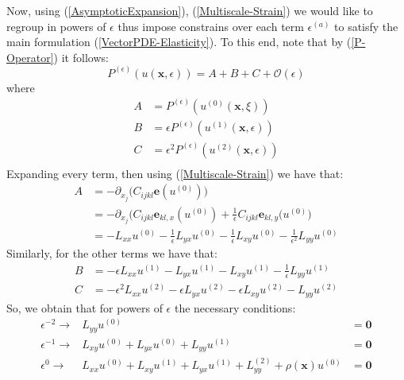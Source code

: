Now, using (\ref{AsymptoticExpansion}), (\ref{Multiscale-Strain}) we would like to regroup in powers of $\epsilon$ thus impose constrains over each term $\epsilon^{(a)}$ to satisfy the main formulation (\ref{VectorPDE-Elasticity}). To this end, note that by (\ref{P-Operator}) it follows:
\begin{equation*}
    P^{(\epsilon)}(u(\mathbf{x},\epsilon)) = A + B + C + \mathcal{O}(\epsilon)
\end{equation*}
where 
\begin{equation*}
    \begin{array}{cc}
        A &= P^{(\epsilon)}(u^{(0)}(\mathbf{x},\xi)) \\
        B &= \epsilon P^{(\epsilon)}(u^{(1)}(\mathbf{x},\epsilon)) \\
        C &= \epsilon^2 P^{(\epsilon)}(u^{(2)}(\mathbf{x},\epsilon)) \\
    \end{array}
\end{equation*}
Expanding every term, then using (\ref{Multiscale-Strain}) we have that:
\begin{align*}
    A &= - \partial_{x_j} \big( C_{ijkl}\mathbf{e}(u^{(0)}) \big) \\
    &=- \partial_{x_j} \big( C_{ijkl} \mathbf{e}_{kl,x} (u^{(0)}) + \frac{1}{\epsilon}C_{ijkl}\mathbf{e}_{kl,y}(u^{(0)} \big)\\
    &= - L_{xx}u^{(0)} - \frac{1}{\epsilon} L_{yx}u^{(0)} - \frac{1}{\epsilon} L_{xy}u^{(0)} - \frac{1}{\epsilon^2}L_{yy}u^{(0)}
\end{align*}
Similarly, for the other terms we have that:
\begin{align*}
    B &= -\epsilon L_{xx} u^{(1)} - L_{yx}u^{(1)} - L_{xy} u^{(1)} - \frac{1}{\epsilon} L_{yy}u^{(1)} \\
    C &= -\epsilon^2 L_{xx} u^{(2)} - \epsilon L_{yx}u^{(2)} - \epsilon L_{xy} u^{(2)} - L_{yy}u^{(2)} 
\end{align*}
So, we obtain that for powers of $\epsilon$ the necessary conditions:
\begin{equation}
    \label{Epsilon-Separation}
    \begin{array}{ccc}
        \epsilon^{-2} \longrightarrow & L_{yy} u^{(0)} &= \mathbf{0} \\
        \epsilon^{-1} \longrightarrow & L_{xy}u^{(0)} + L_{yx} u^{(0)} + L_{yy} u^{(1)} &= \mathbf{0} \\
        \epsilon^{0} \longrightarrow & L_{xx} u^{(0)} + L_{xy} u^{(1)} + L_{yx} u^{(1)} + L_{yy}^{(2)} + \rho(\mathbf{x}) u^{(0)} &= \mathbf{0}
    \end{array}
\end{equation}

